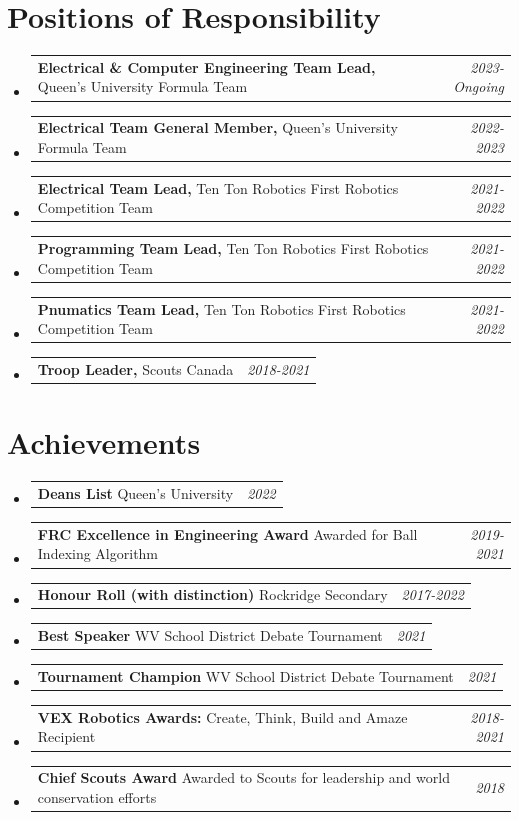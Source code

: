 \documentclass[a4paper,11pt]{article}
\makeatletter
\newcommand{\resumePOR}[3]{
\vspace{0.5mm}\item
    \begin{tabular*}{0.97\textwidth}[t]{l@{\extracolsep{\fill}}r}
        \textbf{#1}\hspace{0.3mm}#2 & \textit{\small{#3}} 
    \end{tabular*}
    \vspace{-2mm}
}
\newcommand{\resumeSubHeadingListStart}{\begin{itemize}[leftmargin=*,labelsep=0mm]}
\newcommand{\resumeSubHeadingListEnd}{\end{itemize}\vspace{2mm}}
\makeatother
\begin{document}
\section{\textbf{Positions of Responsibility}}
\vspace{-0.4mm}
\resumeSubHeadingListStart
\resumePOR{ Electrical \& Computer Engineering Team Lead, } %
    {Queen's University Formula Team} %
    {2023-Ongoing} %
\resumePOR{ Electrical Team General Member, } %
    {Queen's University Formula Team} %
    {2022-2023} %
\resumePOR{ Electrical Team Lead, } %
    {Ten Ton Robotics First Robotics Competition Team} %
    {2021-2022} %
\resumePOR{ Programming Team Lead, } %
    {Ten Ton Robotics First Robotics Competition Team} %
    {2021-2022} %
\resumePOR{ Pnumatics Team Lead, } %
    {Ten Ton Robotics First Robotics Competition Team} %
    {2021-2022} %
\resumePOR{ Troop Leader, } %
    {Scouts Canada} %
    {2018-2021} %
\resumeSubHeadingListEnd
\vspace{-5mm}




\section{\textbf{Achievements}}
\vspace{-0.4mm}
\resumeSubHeadingListStart
\resumePOR{ Deans List } %
    {Queen's University} %
    {2022} %

\resumePOR{ FRC Excellence in Engineering Award } %
    {Awarded for Ball Indexing Algorithm} %
    {2019-2021} %

\resumePOR{ Honour Roll (with distinction) } %
    {Rockridge Secondary} %
    {2017-2022} %

\resumePOR{ Best Speaker } %
    {WV School District Debate Tournament} %
    {2021} %

\resumePOR{ Tournament Champion } %
    {WV School District Debate Tournament} %
    {2021} %

\resumePOR{ VEX Robotics Awards: } %
    {Create, Think, Build and Amaze Recipient} %
    {2018-2021} %
    
\resumePOR{ Chief Scouts Award } %
    {Awarded to Scouts for leadership and world conservation efforts} %
    {2018} %
\resumeSubHeadingListEnd
\vspace{-5mm}
\end{document}
